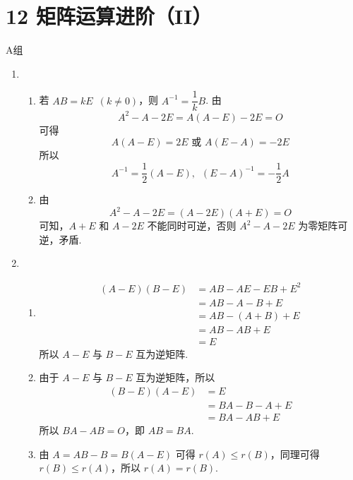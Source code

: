 \section*{12 矩阵运算进阶（II）}

\vspace{2ex}

\centerline{\heiti A组}
\begin{enumerate}
    \item \begin{enumerate}
              \item 若 $ AB = kE \enspace(k \neq 0) $，则 $ A^{-1} = \dfrac{1}{k} B $. 由
                    \[ A^2 - A - 2E = A(A - E) - 2E = O \]
                    可得
                    \[ A(A - E) = 2E \text{~或~} A(E - A) = -2E \]
                    所以
                    \[ A^{-1} = \frac{1}{2}(A-E),\enspace (E - A)^{-1} = -\frac{1}{2}A \]

              \item 由
                    \[  A^2 - A - 2E = (A - 2E)(A + E) = O \]
                    可知，$ A + E $ 和 $ A - 2E $ 不能同时可逆，否则 $ A^2 - A - 2E $ 为零矩阵可逆，矛盾.
          \end{enumerate}

    \item \begin{enumerate}
              \item \begin{align*}
                        (A - E)(B - E) & = AB - AE - EB + E^2 \\
                                       & = AB - A - B + E     \\
                                       & = AB - (A + B) + E   \\
                                       & = AB - AB + E        \\
                                       & = E
                    \end{align*}
                    所以 $ A - E $ 与 $ B - E $ 互为逆矩阵.

              \item 由于 $ A - E $ 与 $ B - E $ 互为逆矩阵，所以
                    \begin{align*}
                        (B - E)(A - E) & = E              \\
                                       & = BA - B - A + E \\
                                       & = BA - AB + E
                    \end{align*}
                    所以 $ BA - AB = O $，即 $ AB = BA $.

              \item 由 $ A = AB - B = B(A - E) $ 可得 $ r(A) \leqslant r(B) $，同理可得 $ r(B) \leqslant r(A) $，所以 $ r(A) = r(B) $.
          \end{enumerate}
\end{enumerate}

